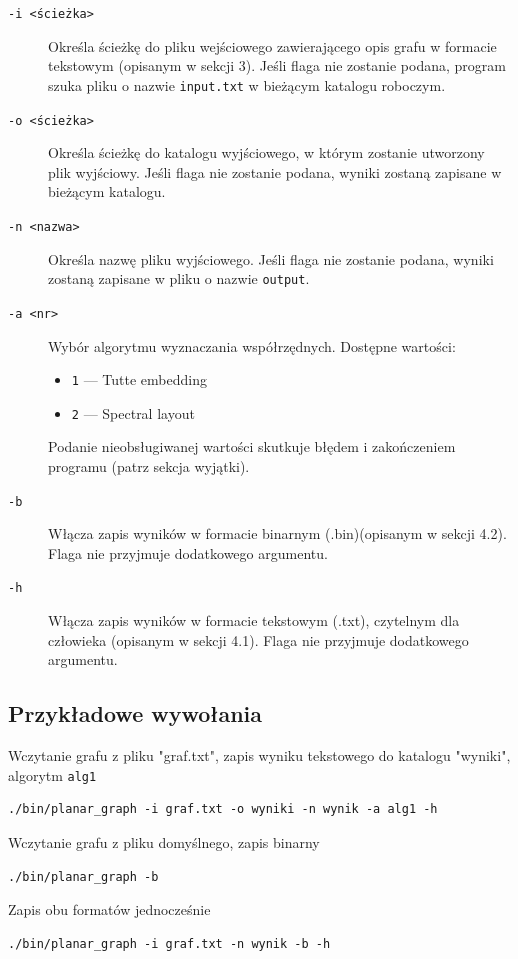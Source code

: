 \documentclass[12pt]{article}
\begin{document}
\begin{description}
	\item[\texttt{-i <ścieżka>}]
	      Określa ścieżkę do pliku wejściowego zawierającego opis grafu w formacie
	      tekstowym (opisanym w sekcji 3). Jeśli flaga nie zostanie podana, program
	      szuka pliku o nazwie \texttt{input.txt} w bieżącym katalogu roboczym.

	\item[\texttt{-o <ścieżka>}]
	      Określa ścieżkę do katalogu wyjściowego, w którym zostanie utworzony plik wyjściowy.
	      Jeśli flaga nie zostanie podana, wyniki zostaną zapisane w bieżącym katalogu.
	\item[\texttt{-n <nazwa>}]
	      Określa nazwę pliku wyjściowego. Jeśli flaga nie zostanie podana, wyniki zostaną zapisane w pliku o nazwie \texttt{output}.

	\item[\texttt{-a <nr>}]
	      Wybór algorytmu wyznaczania współrzędnych. Dostępne wartości:
	      \begin{itemize}
		      \item \texttt{1} — Tutte embedding
		      \item \texttt{2} — Spectral layout
	      \end{itemize}
	      Podanie nieobsługiwanej wartości skutkuje błędem i zakończeniem programu
	      (patrz sekcja wyjątki).

	\item[\texttt{-b}]
	      Włącza zapis wyników w formacie binarnym (.bin)(opisanym w sekcji 4.2).
	      Flaga nie przyjmuje dodatkowego argumentu.

	\item[\texttt{-h}]
	      Włącza zapis wyników w formacie tekstowym (.txt), czytelnym dla człowieka
	      (opisanym w sekcji 4.1). Flaga nie przyjmuje dodatkowego argumentu.
\end{description}

\subsection{Przykładowe wywołania}
Wczytanie grafu z pliku "graf.txt", zapis wyniku tekstowego do katalogu "wyniki", algorytm \texttt{alg1}
\begin{verbatim}
./bin/planar_graph -i graf.txt -o wyniki -n wynik -a alg1 -h
\end{verbatim}
Wczytanie grafu z pliku domyślnego, zapis binarny
\begin{verbatim}
./bin/planar_graph -b
\end{verbatim}
Zapis obu formatów jednocześnie
\begin{verbatim}
./bin/planar_graph -i graf.txt -n wynik -b -h
\end{verbatim}
\end{document}
